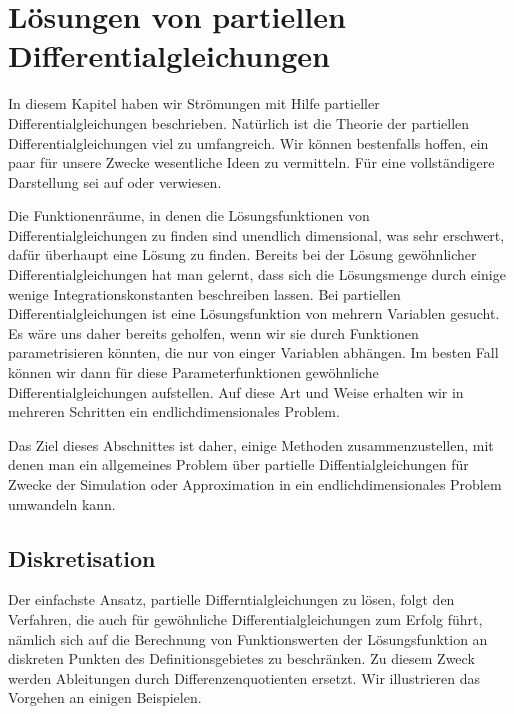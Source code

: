 %
%
%
\section{Lösungen von partiellen Differentialgleichungen%
\label{section:pdeloesungen}}
In diesem Kapitel haben wir Strömungen mit Hilfe partieller
Differentialgleichungen beschrieben.
Natürlich ist die Theorie der partiellen Differentialgleichungen viel
zu umfangreich.
Wir können bestenfalls hoffen, ein paar für unsere Zwecke wesentliche
Ideen zu vermitteln.
Für eine vollständigere Darstellung sei auf \cite{skript:pde}
oder \cite{skript:part-diff} verwiesen.

Die Funktionenräume, in denen die Lösungsfunktionen von Differentialgleichungen
zu finden sind unendlich dimensional, was sehr erschwert,
dafür überhaupt eine Lösung zu finden.
Bereits bei der Lösung gewöhnlicher Differentialgleichungen hat man
gelernt, dass sich die Lösungsmenge durch einige wenige Integrationskonstanten
beschreiben lassen.
Bei partiellen Differentialgleichungen ist eine Lösungsfunktion von
mehrern Variablen gesucht.
Es wäre uns daher bereits geholfen, wenn wir sie durch
Funktionen parametrisieren könnten, die nur von einger Variablen
abhängen.
Im besten Fall können wir dann für diese Parameterfunktionen gewöhnliche
Differentialgleichungen aufstellen.
Auf diese Art und Weise erhalten wir in mehreren Schritten ein
endlichdimensionales Problem.

Das Ziel dieses Abschnittes ist daher, einige Methoden zusammenzustellen,
mit denen man ein allgemeines Problem über partielle Diffentialgleichungen
für Zwecke der Simulation oder Approximation
in ein endlichdimensionales Problem umwandeln kann.

\subsection{Diskretisation\label{section:diskretisation}}
Der einfachste Ansatz, partielle Differntialgleichungen zu lösen,
folgt den Verfahren, die auch für gewöhnliche Differentialgleichungen
\cite{skript:mathsem-dgl} 
zum Erfolg führt, nämlich sich auf die Berechnung von Funktionswerten
der Lösungsfunktion an diskreten Punkten des Definitionsgebietes zu
beschränken.
Zu diesem Zweck werden Ableitungen durch Differenzenquotienten ersetzt.
Wir illustrieren das Vorgehen an einigen Beispielen.

